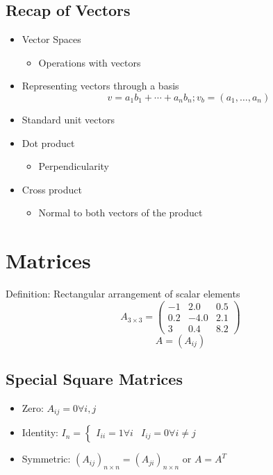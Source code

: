 \documentclass{article}
\begin{document}
\subsection*{Recap of Vectors}
\begin{itemize}
    \item Vector Spaces
    \begin{itemize}
        \item Operations with vectors
    \end{itemize}
    \item Representing vectors through a basis
    \[v = a_1 b_1 + \cdots + a_n b_n; v_b = (a_1, \dots, a_n)\]
    \item Standard unit vectors
    \item Dot product
    \begin{itemize}
        \item Perpendicularity
    \end{itemize}
    \item Cross product
    \begin{itemize}
        \item Normal to both vectors of the product
    \end{itemize}
\end{itemize}


\section*{Matrices}
Definition: Rectangular arrangement of scalar elements
\[A_{3 \times 3} = \left(\begin{matrix} -1 & 2.0 & 0.5 \\ 0.2 & -4.0 & 2.1 \\ 3 & 0.4 & 8.2\end{matrix}\right)\]
\[A = (A_{ij})\]

\subsection*{Special Square Matrices}
\begin{itemize}
    \item Zero: $A_{ij} = 0 \forall i, j$
    \item Identity: $I_n = \begin{cases} I_{ii} = 1 \forall i & I_{ij} = 0 \forall i \neq j \end{cases}$
    \item Symmetric: $(A_{ij})_{n \times n} = (A_{ji})_{n \times n}$ or $A = A^T$
\end{itemize}  
\end{document}
